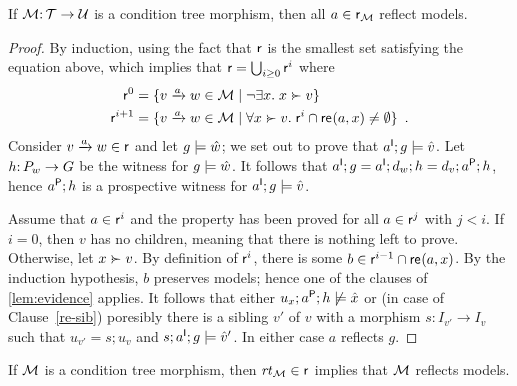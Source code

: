 \begin{lemma}\label{lem:reflection}
If $\cM\of \cT\to \cU$ is a condition tree morphism, then all $a\in\rgen_\cM$ reflect models.
\end{lemma}
%
\begin{proof}
By induction, using the fact that $\rgen$ is the smallest set satisfying the equation above, which implies that $\rgen=\bigcup_{i\geq 0} \rgen^i$ where
%
\begin{align*}
\rgen^0 = {} & \gensetof{\trip vaw\in \cM}{\neg \exists x\st x\childof v} \\
\rgen^{i+1} = {} & \gensetof{\trip vaw\in \cM}{\forall x\childof v\st \rgen^i \cap \re{a,x} \neq\emptyset} \enspace.
\end{align*}
%
Consider $\trip vaw\in \rgen$ and let $g\sat \hat w$; we set out to prove that $a\I;g\sat \hat v$. Let $h\of P_w\to G$ be the witness for $g\sat \hat w$. It follows that $a\I;g=a\I;d_w;h=d_v;a\P;h$, hence $a\P;h$ is a prospective witness for $a\I;g\sat \hat v$.

Assume that $a\in \rgen^i$ and the property has been proved for all $a\in \rgen^j$ with $j<i$. If $i=0$, then $v$ has no children, meaning that there is nothing left to prove. Otherwise, let $x\childof v$. By definition of $\rgen^i$, there is some $b\in \rgen^{i-1} \cap \re{a,x}$. By the induction hypothesis, $b$ preserves models; hence one of the clauses of \cref{lem:evidence} applies. It follows that either $u_x;a\P;h\nsat \hat x$ or (in case of Clause~\ref{re-sib}) poresibly there is a sibling $v'$ of $v$ with a morphism $s:I_{v'}\to I_v$ such that $u_{v'}=s;u_v$ and $s;a\I;g\sat \hat v'$. In either case $a$ reflects $g$.
\end{proof}

\begin{corollary}
If $\cM$ is a condition tree morphism, then $\rtof\cM\in \rgen$ implies that $\cM$ reflects models.
\end{corollary}
